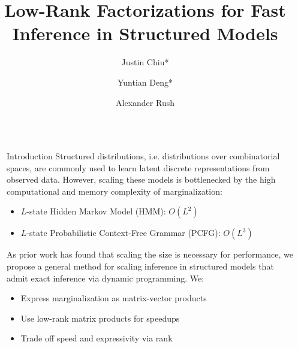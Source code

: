 \documentclass{beamer}
\title{Low-Rank Factorizations for Fast Inference in Structured Models}
\author{Justin Chiu* \inst{1} \and Yuntian Deng* \inst{2} \and Alexander Rush \inst{1}}
\institute[shortinst]{\inst{1} Cornell Tech and \inst{2} Harvard University}
\newlength{\sepwid}
\newlength{\onecolwid}
\begin{document}

\setlength{\belowcaptionskip}{2ex} %
\setlength\belowdisplayshortskip{2ex} %

\begin{frame}


\begin{columns}[t] %

\begin{column}{\sepwid}\end{column} %

\begin{column}{\onecolwid} %


\begin{block}{Introduction}
Structured distributions, i.e. distributions over combinatorial spaces,
are commonly used to learn latent discrete representations from observed data.
However, scaling these models is bottlenecked by the high computational and memory complexity
of marginalization:
\begin{itemize}
\item $L$-state Hidden Markov Model (HMM): $O(L^2)$
\item $L$-state Probabilistic Context-Free Grammar (PCFG): $O(L^3)$
\end{itemize}
As prior work has found that scaling the size is necessary for performance,
we propose a general method for scaling inference in structured models that admit
exact inference via dynamic programming.
We:
\begin{itemize}
\item Express marginalization as matrix-vector products
\item Use low-rank matrix products for speedups
\item Trade off speed and expressivity via rank
\end{itemize}
\end{block}


\end{column}
\end{columns}
\end{frame}
\end{document}
